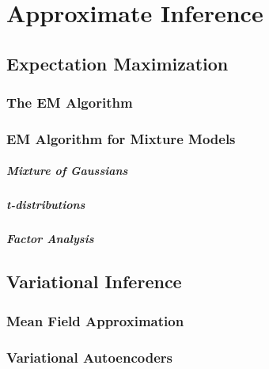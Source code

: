 
\chapter{Approximate Inference}
\label{chapter9}

\section{Expectation Maximization}

\subsection{The EM Algorithm}

\subsection{EM Algorithm for Mixture Models}

\paragraph{Mixture of Gaussians}

\paragraph{t-distributions}

\paragraph{Factor Analysis}

\section{Variational Inference}

\subsection{Mean Field Approximation}

\subsection{Variational Autoencoders}